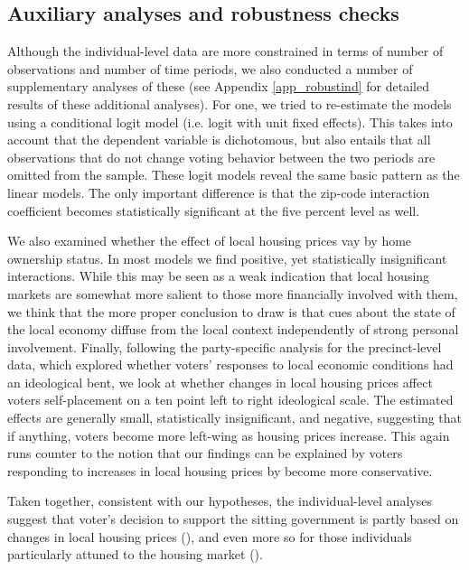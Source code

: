 \documentclass[12pt,a4paper]{article}
\begin{document}
	
	\subsection{Auxiliary analyses and robustness checks}
	
	Although the individual-level data are more constrained in terms of number of observations and number of time periods, we also conducted a number of supplementary analyses of these (see Appendix \ref{app_robustind} for detailed results of these additional analyses). For one, we tried to re-estimate the models using a conditional logit model (i.e. logit with unit fixed effects). This takes into account that the dependent variable is dichotomous, but also entails that all observations that do not change voting behavior between the two periods are omitted from the sample. These logit models reveal the same basic pattern as the linear models. The only important difference is that the zip-code interaction coefficient becomes statistically significant at the five percent level as well. 
	
	We also examined whether the effect of local housing prices vay by home ownership status. In most models we find positive, yet statistically insignificant interactions. While this may be seen as a weak indication that local housing markets are somewhat more salient to those more financially involved with them, we think that the more proper conclusion to draw is that cues about the state of the local economy diffuse from the local context independently of strong personal involvement. 
	Finally, following the party-specific analysis for the precinct-level data, which explored whether voters’ responses to local economic conditions had an ideological bent, we look at whether changes in local housing prices affect voters self-placement on a ten point left to right ideological scale. The estimated effects are generally small, statistically insignificant, and negative, suggesting that if anything, voters become more left-wing as housing prices increase. This again runs counter to the notion that our findings can be explained by voters responding to increases in local housing prices by become more  conservative.
	
	Taken together, consistent with our hypotheses, the individual-level analyses suggest that voter’s decision to support the sitting government is partly based on changes in local housing prices (\hone), and even more so for those individuals particularly attuned to the housing market (\htwo). 
	
\end{document}
